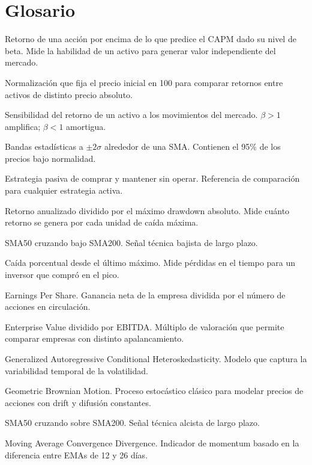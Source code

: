 \documentclass[11pt, a4paper]{article}
\begin{document}
\section{Glosario}

\begin{description}[style=nextline, leftmargin=3cm, font=\bfseries\color{gold}]
  \item[Alpha ($\alpha$)] Retorno de una acción por encima de lo que predice el CAPM dado su nivel de beta. Mide la habilidad de un activo para generar valor independiente del mercado.
  \item[Base 100] Normalización que fija el precio inicial en 100 para comparar retornos entre activos de distinto precio absoluto.
  \item[Beta ($\beta$)] Sensibilidad del retorno de un activo a los movimientos del mercado. $\beta > 1$ amplifica; $\beta < 1$ amortigua.
  \item[Bollinger Bands] Bandas estadísticas a $\pm 2\sigma$ alrededor de una SMA. Contienen el 95\% de los precios bajo normalidad.
  \item[Buy \& Hold (B\&H)] Estrategia pasiva de comprar y mantener sin operar. Referencia de comparación para cualquier estrategia activa.
  \item[Calmar Ratio] Retorno anualizado dividido por el máximo drawdown absoluto. Mide cuánto retorno se genera por cada unidad de caída máxima.
  \item[Death Cross] SMA50 cruzando bajo SMA200. Señal técnica bajista de largo plazo.
  \item[Drawdown] Caída porcentual desde el último máximo. Mide pérdidas en el tiempo para un inversor que compró en el pico.
  \item[EPS] Earnings Per Share. Ganancia neta de la empresa dividida por el número de acciones en circulación.
  \item[EV/EBITDA] Enterprise Value dividido por EBITDA. Múltiplo de valoración que permite comparar empresas con distinto apalancamiento.
  \item[GARCH] Generalized Autoregressive Conditional Heteroskedasticity. Modelo que captura la variabilidad temporal de la volatilidad.
  \item[GBM] Geometric Brownian Motion. Proceso estocástico clásico para modelar precios de acciones con drift y difusión constantes.
  \item[Golden Cross] SMA50 cruzando sobre SMA200. Señal técnica alcista de largo plazo.
  \item[MACD] Moving Average Convergence Divergence. Indicador de momentum basado en la diferencia entre EMAs de 12 y 26 días.

\end{description}
\end{document}

